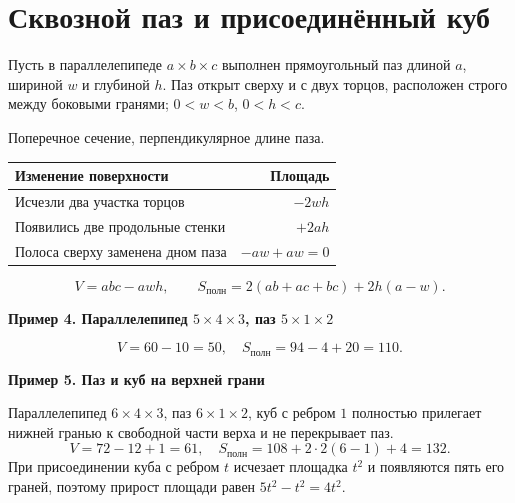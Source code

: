 \documentclass[a4paper,12pt]{article}
\newcommand{\sub}[1]{\par\medskip\textcolor{darkaccent}{\textbf{#1}}\par\smallskip}
\newcommand{\Sp}{S_{\text{полн}}}
\begin{document}
\section{Сквозной паз и присоединённый куб}
Пусть в параллелепипеде $a\times b\times c$ выполнен прямоугольный паз длиной $a$, шириной $w$ и глубиной $h$. Паз открыт сверху и с двух торцов, расположен строго между боковыми гранями; $0<w<b$, $0<h<c$.
\begin{center}
\par\small Поперечное сечение, перпендикулярное длине паза.
\end{center}
\begin{tabularx}{\linewidth}{@{}Xr@{}}
\toprule
Изменение поверхности & Площадь\\\midrule
Исчезли два участка торцов & $-2wh$\\
Появились две продольные стенки & $+2ah$\\
Полоса сверху заменена дном паза & $-aw+aw=0$\\\bottomrule
\end{tabularx}
\[
V=abc-awh,\qquad \Sp=2(ab+ac+bc)+2h(a-w).
\]
\sub{Пример 4. Параллелепипед $5\times4\times3$, паз $5\times1\times2$}
\[
V=60-10=50,\quad \Sp=94-4+20=110.
\]
\sub{Пример 5. Паз и куб на верхней грани}
Параллелепипед $6\times4\times3$, паз $6\times1\times2$, куб с ребром $1$ полностью прилегает нижней гранью к свободной части верха и не перекрывает паз.
\[
V=72-12+1=61,\quad \Sp=108+2\cdot2(6-1)+4=132.
\]
При присоединении куба с ребром $t$ исчезает площадка $t^2$ и появляются пять его граней, поэтому прирост площади равен $5t^2-t^2=4t^2$.
\clearpage
\end{document}
